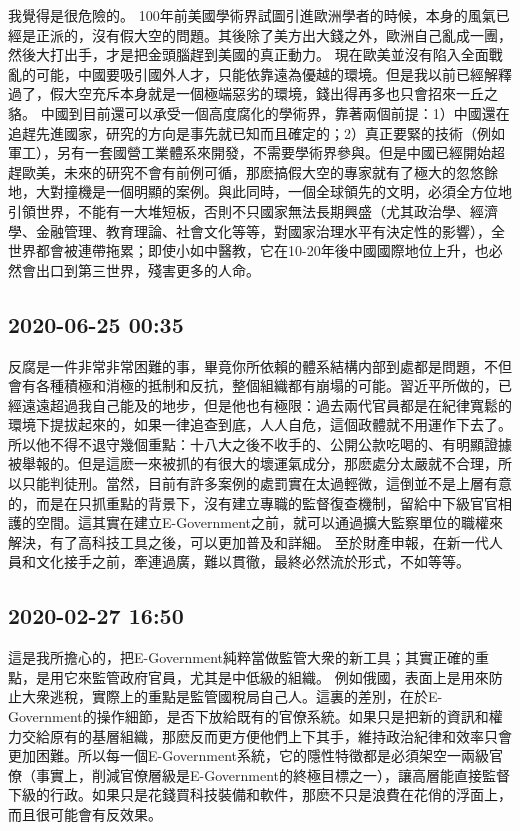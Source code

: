 \documentclass[twocolumn]{ctexart}
\begin{document}
我覺得是很危險的。
100年前美國學術界試圖引進歐洲學者的時候，本身的風氣已經是正派的，沒有假大空的問題。其後除了美方出大錢之外，歐洲自己亂成一團，然後大打出手，才是把金頭腦趕到美國的真正動力。
現在歐美並沒有陷入全面戰亂的可能，中國要吸引國外人才，只能依靠遠為優越的環境。但是我以前已經解釋過了，假大空充斥本身就是一個極端惡劣的環境，錢出得再多也只會招來一丘之貉。
中國到目前還可以承受一個高度腐化的學術界，靠著兩個前提：1）中國還在追趕先進國家，研究的方向是事先就已知而且確定的；2）真正要緊的技術（例如軍工），另有一套國營工業體系來開發，不需要學術界參與。但是中國已經開始超趕歐美，未來的研究不會有前例可循，那麽搞假大空的專家就有了極大的忽悠餘地，大對撞機是一個明顯的案例。與此同時，一個全球領先的文明，必須全方位地引領世界，不能有一大堆短板，否則不只國家無法長期興盛（尤其政治學、經濟學、金融管理、教育理論、社會文化等等，對國家治理水平有決定性的影響），全世界都會被連帶拖累；即使小如中醫教，它在10-20年後中國國際地位上升，也必然會出口到第三世界，殘害更多的人命。
\subsection*{2020-06-25 00:35}

反腐是一件非常非常困難的事，畢竟你所依賴的體系結構内部到處都是問題，不但會有各種積極和消極的抵制和反抗，整個組織都有崩塌的可能。習近平所做的，已經遠遠超過我自己能及的地步，但是他也有極限：過去兩代官員都是在紀律寬鬆的環境下提拔起來的，如果一律追查到底，人人自危，這個政體就不用運作下去了。
所以他不得不退守幾個重點：十八大之後不收手的、公開公款吃喝的、有明顯證據被舉報的。但是這麽一來被抓的有很大的壞運氣成分，那麽處分太嚴就不合理，所以只能判徒刑。當然，目前有許多案例的處罰實在太過輕微，這倒並不是上層有意的，而是在只抓重點的背景下，沒有建立專職的監督復查機制，留給中下級官官相護的空間。這其實在建立E-Government之前，就可以通過擴大監察單位的職權來解決，有了高科技工具之後，可以更加普及和詳細。
至於財產申報，在新一代人員和文化接手之前，牽連過廣，難以貫徹，最終必然流於形式，不如等等。
\subsection*{2020-02-27 16:50}

這是我所擔心的，把E-Government純粹當做監管大衆的新工具；其實正確的重點，是用它來監管政府官員，尤其是中低級的組織。
例如俄國，表面上是用來防止大衆逃稅，實際上的重點是監管國稅局自己人。這裏的差別，在於E-Government的操作細節，是否下放給既有的官僚系統。如果只是把新的資訊和權力交給原有的基層組織，那麽反而更方便他們上下其手，維持政治紀律和效率只會更加困難。所以每一個E-Government系統，它的隱性特徵都是必須架空一兩級官僚（事實上，削減官僚層級是E-Government的終極目標之一），讓高層能直接監督下級的行政。如果只是花錢買科技裝備和軟件，那麽不只是浪費在花俏的浮面上，而且很可能會有反效果。
\end{document}
